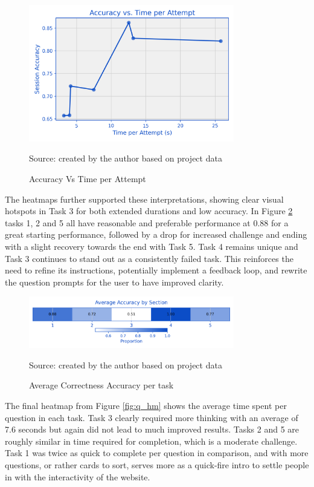 \begin{figure}[hbtp]
\centering
\includegraphics[width=0.8\textwidth]{figures/accuracy_vs_time.png}
\caption{Accuracy Vs Time per Attempt}
\label{fig:acc}
{\raggedright \small{Source: created by the author based on project data}\par}
\end{figure}

The heatmaps further supported these interpretations, showing clear visual hotspots in Task 3 for both extended durations and low accuracy. 
In Figure \ref{fig:acc_hm} tasks 1, 2 and 5 all have reasonable and preferable performance at 0.88 for a great starting performance, followed by a drop for increased challenge and ending with a slight recovery towards the end with Task 5.
Task 4 remains unique and Task 3 continues to stand out as a consistently failed task. 
This reinforces the need to refine its instructions, potentially implement a feedback loop, and rewrite the question prompts for the user to have improved clarity.

\begin{figure}[hbtp]
\centering
\includegraphics[width=0.8\textwidth]{figures/heatmap_accuracy.png}
\caption{Average Correctness Accuracy per task}
\label{fig:acc_hm}
{\raggedright \small{Source: created by the author based on project data}\par}
\end{figure}

The final heatmap from Figure \ref{fig:q_hm} shows the average time spent per question in each task. 
Task 3 clearly required more thinking with an average of 7.6 seconds but again did not lead to much improved results. 
Tasks 2 and 5 are roughly similar in time required for completion, which is a moderate challenge. 
Task 1 was twice as quick to complete per question in comparison, and with more questions, or rather cards to sort, serves more as a quick-fire intro to settle people in with the interactivity of the website.

